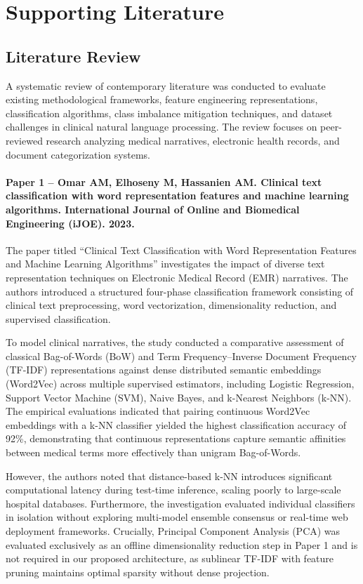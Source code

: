 \clearpage

\section{Supporting Literature}

\subsection{Literature Review}
A systematic review of contemporary literature was conducted to evaluate existing methodological frameworks, feature engineering representations, classification algorithms, class imbalance mitigation techniques, and dataset challenges in clinical natural language processing. The review focuses on peer-reviewed research analyzing medical narratives, electronic health records, and document categorization systems.

\paragraph{Paper 1 -- Omar AM, Elhoseny M, Hassanien AM. Clinical text classification with word representation features and machine learning algorithms. International Journal of Online and Biomedical Engineering (iJOE). 2023.}

The paper titled ``Clinical Text Classification with Word Representation Features and Machine Learning Algorithms'' \cite{omar2023} investigates the impact of diverse text representation techniques on Electronic Medical Record (EMR) narratives. The authors introduced a structured four-phase classification framework consisting of clinical text preprocessing, word vectorization, dimensionality reduction, and supervised classification.

To model clinical narratives, the study conducted a comparative assessment of classical Bag-of-Words (BoW) and Term Frequency--\allowbreak Inverse Document Frequency (TF-IDF) representations against dense distributed semantic embeddings (Word2Vec) across multiple supervised estimators, including Logistic Regression, Support Vector Machine (SVM), Naive Bayes, and k-Nearest Neighbors (k-NN). The empirical evaluations indicated that pairing continuous Word2Vec embeddings with a k-NN classifier yielded the highest classification accuracy of 92\%, demonstrating that continuous representations capture semantic affinities between medical terms more effectively than unigram Bag-of-Words.

However, the authors noted that distance-based k-NN introduces significant computational latency during test-time inference, scaling poorly to large-scale hospital databases. Furthermore, the investigation evaluated individual classifiers in isolation without exploring multi-model ensemble consensus or real-time web deployment frameworks. Crucially, Principal Component Analysis (PCA) was evaluated exclusively as an offline dimensionality reduction step in Paper 1 and is not required in our proposed architecture, as sublinear TF-IDF with feature pruning maintains optimal sparsity without dense projection.

